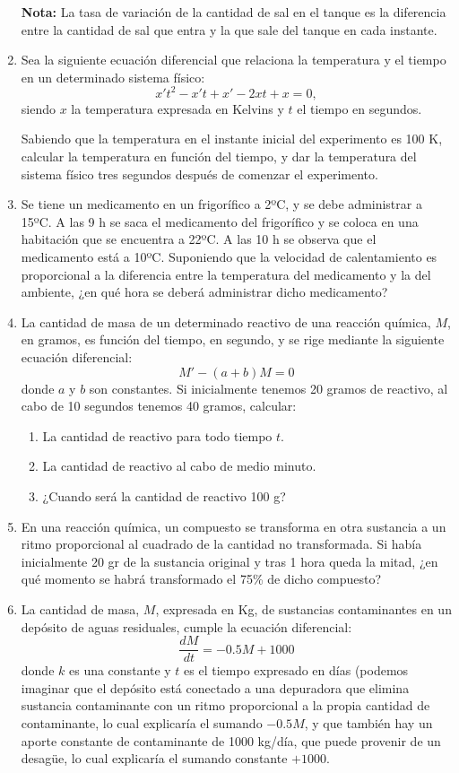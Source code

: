 \documentclass[a4paper,titlepage]{article}
\theoremstyle{solution}
\begin{document}
\begin{enumerate}[resume, leftmargin=*]
\noindent\textbf{Nota:} La tasa de variación de la cantidad de sal en el tanque es la diferencia entre la cantidad de sal que entra y la que sale del tanque en cada instante.

\item Sea la siguiente ecuación diferencial que relaciona la temperatura y el tiempo en un determinado sistema físico:
\[
x't^2-x't+x'-2xt+x=0,
\]
siendo $x$ la temperatura expresada en Kelvins y $t$ el tiempo en segundos. 

Sabiendo que la temperatura en el instante inicial del experimento es 100 K, calcular la temperatura en función del tiempo, y dar la temperatura del sistema físico tres segundos después de comenzar el experimento.

\item Se tiene un medicamento en un frigorífico a 2ºC, y se debe administrar a 15ºC.
A las 9 h se saca el medicamento del frigorífico y se coloca en una habitación que se encuentra a 22ºC.
A las 10 h se observa que el medicamento está a 10ºC.
Suponiendo que la velocidad de calentamiento es proporcional a la diferencia entre la temperatura del medicamento y la del ambiente, ¿en qué hora se deberá administrar dicho medicamento?

\item La cantidad de masa de un determinado reactivo de una reacción química, $M$, en gramos, es función del tiempo, en segundo, y se rige mediante la siguiente ecuación diferencial:
\[
M'-(a+b)M=0
\]
donde $a$ y $b$ son constantes.
Si inicialmente tenemos 20 gramos de reactivo, al cabo de 10 segundos tenemos 40 gramos, calcular:
\begin{enumerate}
\item La cantidad de reactivo para todo tiempo $t$.
\item La cantidad de reactivo al cabo de medio minuto.
\item ¿Cuando será la cantidad de reactivo 100 g?
\end{enumerate}

\item En una reacción química, un compuesto se transforma en otra sustancia a un ritmo proporcional al cuadrado de la cantidad no transformada.
Si había inicialmente 20 gr de la sustancia original y tras 1 hora queda la mitad, ¿en qué momento se habrá transformado el 75\% de dicho compuesto?

\item La cantidad de masa, $M$, expresada en Kg, de sustancias contaminantes en un depósito de aguas residuales, cumple la ecuación diferencial:
\[
\frac{dM}{dt}=-0.5M+1000
\]
donde $k$ es una constante y $t$ es el tiempo expresado en días (podemos imaginar que el depósito está conectado a una
depuradora que elimina sustancia contaminante con un ritmo proporcional a la propia cantidad de contaminante, lo cual
explicaría el sumando $-0.5M$, y que también hay un aporte constante de contaminante de 1000 kg/día, que puede provenir
de un desagüe, lo cual explicaría el sumando constante $+1000$.


\end{enumerate}
\end{document}
